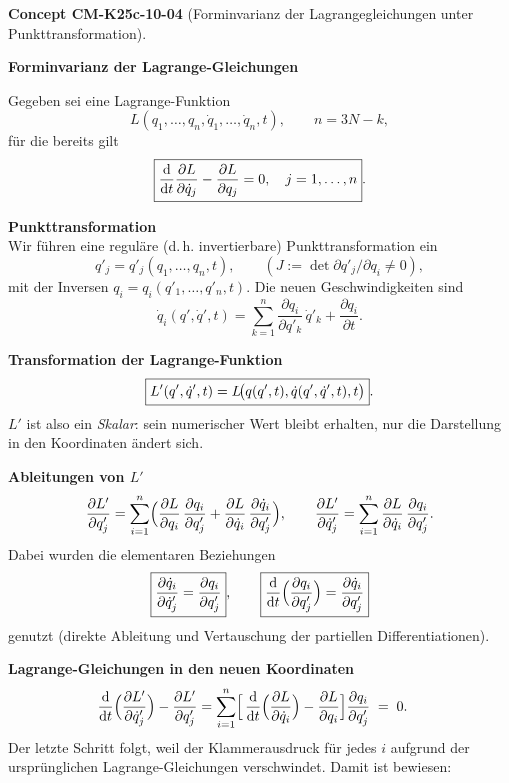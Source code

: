 \documentclass[10pt, letterpaper]{article}
\newcommand{\CustomHeading}[3]{%
  \par\medskip\noindent%
  \textbf{#1 #2} \textnormal{(#3)}.\enskip%
}
\newenvironment{CONC}[2]{\CustomHeading{Concept}{#1}{#2}}{}
\begin{document}
\begin{CONC}{CM-K25c-10-04}{Forminvarianz der Lagrangegleichungen unter Punkttransformation}
\textbf{Forminvarianz der Lagrange-Gleichungen}

Gegeben sei eine Lagrange-Funktion
\[
  L(q_1,\dots,q_n,\dot q_1,\dots,\dot q_n,t),
  \qquad
  n = 3N-k ,
\]
für die bereits gilt
\[
  \boxed{%
    \frac{\mathrm d}{\mathrm dt}\frac{\partial L}{\partial\dot q_j}
    -\frac{\partial L}{\partial q_j}=0,
    \quad j=1,\dots,n }.
\]

\textbf{Punkttransformation}\\
Wir führen eine reguläre (d.\,h. invertierbare) Punkttransformation ein  
\[
  q'_j = q'_j(q_1,\dots,q_n,t),
  \qquad
  (J:=\det{\partial q'_j/\partial q_i}\neq0),
\]
mit der Inversen
\( q_i = q_i(q'_1,\dots,q'_n,t) \).
Die neuen Geschwindigkeiten sind
\[
  \dot q_i(q',\dot q',t)
  =\sum_{k=1}^{n}\frac{\partial q_i}{\partial q'_k}\,\dot q'_k
   +\frac{\partial q_i}{\partial t}.
\]

\textbf{Transformation der Lagrange-Funktion}\\
\[
  \boxed{%
    L'(q',\dot q',t)
    =L\!\bigl(q(q',t),\dot q(q',\dot q',t),t\bigr)}.
\]
$L'$ ist also ein \emph{Skalar}: sein numerischer Wert bleibt erhalten,
nur die Darstellung in den Koordinaten ändert sich.

\textbf{Ableitungen von $L'$}
\[
  \frac{\partial L'}{\partial q'_j}
  =\sum_{i=1}^{n}\Bigl(
      \frac{\partial L}{\partial q_i}\,
      \frac{\partial q_i}{\partial q'_j}
     +\frac{\partial L}{\partial\dot q_i}\,
      \frac{\partial\dot q_i}{\partial q'_j}\Bigr),\qquad
  \frac{\partial L'}{\partial\dot q'_j}
  =\sum_{i=1}^{n}
      \frac{\partial L}{\partial\dot q_i}\,
      \frac{\partial q_i}{\partial q'_j}.
\]
Dabei wurden die elementaren Beziehungen
\[
  \boxed{%
    \frac{\partial\dot q_i}{\partial\dot q'_j}=
    \frac{\partial q_i}{\partial q'_j}},
  \qquad
  \boxed{%
    \frac{\mathrm d}{\mathrm dt}
    \Bigl(\frac{\partial q_i}{\partial q'_j}\Bigr)=
    \frac{\partial\dot q_i}{\partial q'_j}}
\]
genutzt (direkte Ableitung und Vertauschung der partiellen Differentiationen).

\textbf{Lagrange-Gleichungen in den neuen Koordinaten}
\[
\begin{aligned}
  \frac{\mathrm d}{\mathrm dt}
    \Bigl(\frac{\partial L'}{\partial\dot q'_j}\Bigr)
  -\frac{\partial L'}{\partial q'_j}
  &=
  \sum_{i=1}^{n}
    \Bigl[\,
      \frac{\mathrm d}{\mathrm dt}
        \Bigl(\frac{\partial L}{\partial\dot q_i}\Bigr)
      -\frac{\partial L}{\partial q_i}\Bigr]
    \frac{\partial q_i}{\partial q'_j}\;=\;0 .
\end{aligned}
\]
Der letzte Schritt folgt, weil der Klammerausdruck für jedes
$i$ aufgrund der ursprünglichen Lagrange-Gleichungen verschwindet.
Damit ist bewiesen:


\end{CONC}
\end{document}

